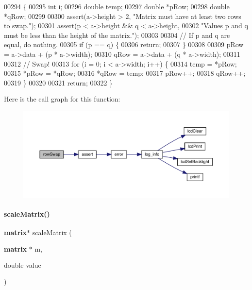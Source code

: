 \begin{DoxyCode}
00294                                       \{
00295   \textcolor{keywordtype}{int} i;
00296   \textcolor{keywordtype}{double} temp;
00297   \textcolor{keywordtype}{double} *pRow;
00298   \textcolor{keywordtype}{double} *qRow;
00299 
00300   assert(a->height > 2, \textcolor{stringliteral}{"Matrix must have at least two rows to swap."});
00301   assert(p < a->height && q < a->height,
00302          \textcolor{stringliteral}{"Values p and q must be less than the height of the matrix."});
00303 
00304   \textcolor{comment}{// If p and q are equal, do nothing.}
00305   \textcolor{keywordflow}{if} (p == q) \{
00306     \textcolor{keywordflow}{return};
00307   \}
00308 
00309   pRow = a->data + (p * a->width);
00310   qRow = a->data + (q * a->width);
00311 
00312   \textcolor{comment}{// Swap!}
00313   \textcolor{keywordflow}{for} (i = 0; i < a->width; i++) \{
00314     temp = *pRow;
00315     *pRow = *qRow;
00316     *qRow = temp;
00317     pRow++;
00318     qRow++;
00319   \}
00320 
00321   \textcolor{keywordflow}{return};
00322 \}
\end{DoxyCode}
Here is the call graph for this function\+:
\nopagebreak
\begin{figure}[H]
\begin{center}
\leavevmode
\includegraphics[width=350pt]{matrix_8c_acdd57777a972ce339153878fa917db14_cgraph}
\end{center}
\end{figure}
\mbox{\label{matrix_8c_a6b7faa6ba9ee987d0777d9d0bd0e7b32}} 
\paragraph{scale\+Matrix()}
{\footnotesize\ttfamily \textbf{ matrix}$\ast$ scale\+Matrix (\begin{DoxyParamCaption}\item[{\textbf{ matrix} $\ast$}]{m,  }\item[{double}]{value }\end{DoxyParamCaption})}



